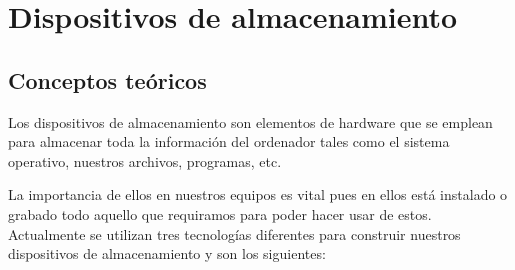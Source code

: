 \documentclass[10pt,journal]{IEEEtran}
\begin{document}
\section{\textbf{Dispositivos de almacenamiento}}
\vspace{-22 mm}
\subsection{\textbf{Conceptos teóricos}}
\vspace{-14 mm}
Los dispositivos de almacenamiento son elementos de hardware que se emplean para almacenar toda la información del ordenador tales como el sistema operativo, nuestros archivos, programas, etc.\par La importancia de ellos en nuestros equipos es vital pues en ellos está instalado o grabado todo aquello que requiramos para poder hacer usar de estos.
Actualmente se utilizan tres tecnologías diferentes para construir nuestros dispositivos de almacenamiento y son los siguientes:\par
\end{document}
